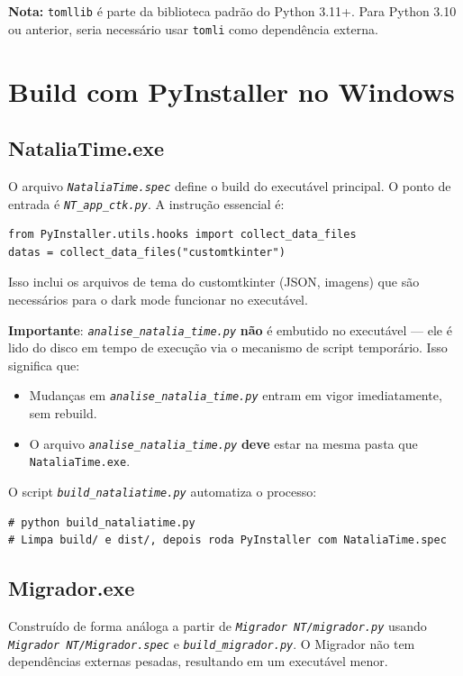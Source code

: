 \documentclass[12pt,a4paper]{report}
\newcommand{\code}[1]{\texttt{#1}}
\newcommand{\arquivo}[1]{\texttt{\itshape #1}}
\begin{document}
\textbf{Nota:} \code{tomllib} é parte da biblioteca padrão do Python 3.11+.
Para Python 3.10 ou anterior, seria necessário usar \code{tomli} como
dependência externa.

\section{Build com PyInstaller no Windows}

\subsection{NataliaTime.exe}

O arquivo \arquivo{NataliaTime.spec} define o build do executável principal.
O ponto de entrada é \arquivo{NT\_app\_ctk.py}. A instrução essencial é:

\begin{lstlisting}[language={},caption={Trecho relevante do NataliaTime.spec}]
from PyInstaller.utils.hooks import collect_data_files
datas = collect_data_files("customtkinter")
\end{lstlisting}

Isso inclui os arquivos de tema do customtkinter (JSON, imagens) que são
necessários para o dark mode funcionar no executável.

\textbf{Importante}: \arquivo{analise\_natalia\_time.py} \textbf{não} é
embutido no executável — ele é lido do disco em tempo de execução via o
mecanismo de script temporário. Isso significa que:
\begin{itemize}
  \item Mudanças em \arquivo{analise\_natalia\_time.py} entram em vigor
    imediatamente, sem rebuild.
  \item O arquivo \arquivo{analise\_natalia\_time.py} \textbf{deve} estar na
    mesma pasta que \texttt{NataliaTime.exe}.
\end{itemize}

O script \arquivo{build\_nataliatime.py} automatiza o processo:
\begin{lstlisting}[caption={Build automatizado}]
# python build_nataliatime.py
# Limpa build/ e dist/, depois roda PyInstaller com NataliaTime.spec
\end{lstlisting}

\subsection{Migrador.exe}

Construído de forma análoga a partir de \arquivo{Migrador NT/migrador.py}
usando \arquivo{Migrador NT/Migrador.spec} e \arquivo{build\_migrador.py}.
O Migrador não tem dependências externas pesadas, resultando em um executável
menor.
\end{document}
